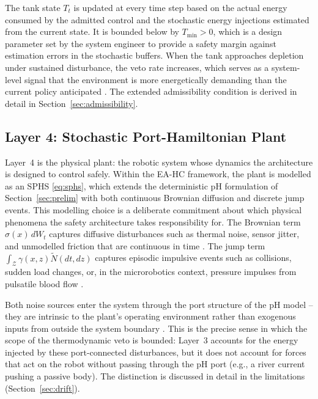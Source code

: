 \documentclass[11pt]{article}
\begin{document}
The tank state $T_t$ is updated at every time step based on the actual energy consumed by
the admitted control and the stochastic energy injections estimated from the current state. It
is bounded below by $T_{\min}>0$, which is a design parameter set by the system engineer to
provide a safety margin against estimation errors in the stochastic buffers. When the tank
approaches depletion under sustained disturbance, the veto rate increases, which serves as a
system-level signal that the environment is more energetically demanding than the current
policy anticipated \cite{ferraguti2015}. The extended admissibility condition is derived in
detail in Section~\ref{sec:admissibility}.

\subsection{Layer 4: Stochastic Port-Hamiltonian Plant}
\label{sec:layer4}

Layer~4 is the physical plant: the robotic system whose dynamics the architecture is designed
to control safely. Within the EA-HC framework, the plant is modelled as an SPHS \eqref{eq:sphs},
which extends the deterministic pH formulation of Section~\ref{sec:prelim} with both continuous
Brownian diffusion and discrete jump events. This modelling choice is a deliberate commitment
about which physical phenomena the safety architecture takes responsibility for. The Brownian
term $\sigma(x)\,dW_t$ captures diffusive disturbances such as thermal noise, sensor jitter,
and unmodelled friction that are continuous in time \cite{gardiner1985,jazwinski1970}. The jump
term $\int_{\mathcal{Z}}\gamma(x,z)\tilde{N}(dt,dz)$ captures episodic impulsive events such
as collisions, sudden load changes, or, in the microrobotics context, pressure impulses from
pulsatile blood flow \cite{applebaum2009,ku1997}.

Both noise sources enter the system through the port structure of the pH model -- they are
intrinsic to the plant's operating environment rather than exogenous inputs from outside the
system boundary \cite{vanderschaft1995,cordoni2022}. This is the precise sense in which the
scope of the thermodynamic veto is bounded: Layer~3 accounts for the energy injected by these
port-connected disturbances, but it does not account for forces that act on the robot without
passing through the pH port (e.g., a river current pushing a passive body). The distinction is
discussed in detail in the limitations (Section~\ref{sec:drift}).
\end{document}
